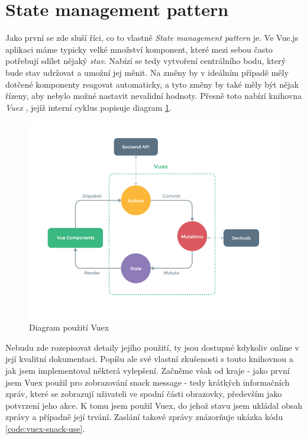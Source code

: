 
\section{State management pattern} \label{impl:vuex}

Jako první se zde sluší říci, co to vlastně \emph{State management pattern} je. Ve Vue.js aplikaci máme typicky velké množství komponent, které mezi sebou často potřebují sdílet nějaký \emph{stav}. Nabízí se tedy vytvoření centrálního bodu, který bude stav udržovat a umožní jej měnit. Na změny by v ideálním případě měly dotčené komponenty reagovat automaticky, a tyto změny by také měly být nějak řízeny, aby nebylo možné nastavit nevalidní hodnoty. Přesně toto nabízí knihovna \emph{Vuex} \cite{vuex}, jejíž interní cyklus popisuje diagram \ref{picture:vuex}.

\begin{figure}[h]
\includegraphics[width=\textwidth]{../png/diagrams/vuex.png}
\caption{Diagram použití Vuex}\label{picture:vuex}
\end{figure}

Nebudu zde rozepisovat detaily jejího použití, ty jsou dostupné kdykoliv online v její kvalitní dokumentaci. Popíšu ale své vlastní zkušenosti s touto knihovnou a jak jsem implementoval některá vylepšení. Začněme však od kraje - jako první jsem Vuex použil pro zobrazování snack message - tedy krátkých informačních zpráv, které se zobrazují uživateli ve spodní části obrazovky, především jako potvrzení jeho akce. K tomu jsem použil Vuex, do jehož stavu jsem ukládal obsah zprávy a případně její trvání. Zaslání takové zprávy znázorňuje ukázka kódu \ref{code:vuex-snack-use}.

